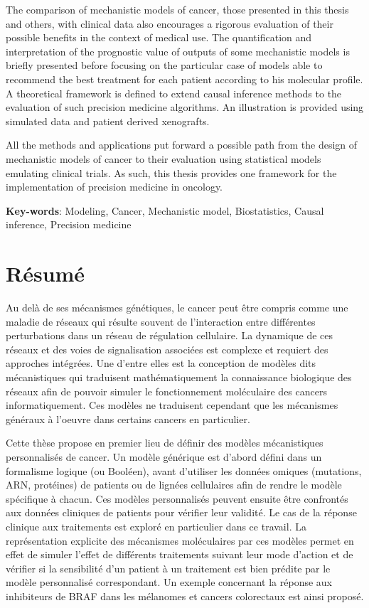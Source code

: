 \documentclass[a4paper,12pt,twoside,onecolumn,openright,final,oldfontcommands]{memoir}
\newcommand{\initial}[1]{
	\lettrine[lines=3,lhang=0.33,nindent=0em]{
		\color{gray}
     		{\textsc{#1}}}{}}
\begin{document}
The comparison of mechanistic models of cancer, those presented in this
thesis and others, with clinical data also encourages a rigorous
evaluation of their possible benefits in the context of medical use. The
quantification and interpretation of the prognostic value of outputs of
some mechanistic models is briefly presented before focusing on the
particular case of models able to recommend the best treatment for each
patient according to his molecular profile. A theoretical framework is
defined to extend causal inference methods to the evaluation of such
precision medicine algorithms. An illustration is provided using
simulated data and patient derived xenografts.

All the methods and applications put forward a possible path from the
design of mechanistic models of cancer to their evaluation using
statistical models emulating clinical trials. As such, this thesis
provides one framework for the implementation of precision medicine in
oncology.

\vspace{\baselineskip}

\textbf{Key-words}: Modeling, Cancer, Mechanistic model, Biostatistics,
Causal inference, Precision medicine

\chapter*{Résumé}

\initial{A}u delà de ses mécanismes génétiques, le cancer peut être
compris comme une maladie de réseaux qui résulte souvent de
l'interaction entre différentes perturbations dans un réseau de
régulation cellulaire. La dynamique de ces réseaux et des voies de
signalisation associées est complexe et requiert des approches
intégrées. Une d'entre elles est la conception de modèles dits
mécanistiques qui traduisent mathématiquement la connaissance biologique
des réseaux afin de pouvoir simuler le fonctionnement moléculaire des
cancers informatiquement. Ces modèles ne traduisent cependant que les
mécanismes généraux à l'oeuvre dans certains cancers en particulier.

Cette thèse propose en premier lieu de définir des modèles mécanistiques
personnalisés de cancer. Un modèle générique est d'abord défini dans un
formalisme logique (ou Booléen), avant d'utiliser les données omiques
(mutations, ARN, protéines) de patients ou de lignées cellulaires afin
de rendre le modèle spécifique à chacun. Ces modèles personnalisés
peuvent ensuite être confrontés aux données cliniques de patients pour
vérifier leur validité. Le cas de la réponse clinique aux traitements
est exploré en particulier dans ce travail. La représentation explicite
des mécanismes moléculaires par ces modèles permet en effet de simuler
l'effet de différents traitements suivant leur mode d'action et de
vérifier si la sensibilité d'un patient à un traitement est bien prédite
par le modèle personnalisé correspondant. Un exemple concernant la
réponse aux inhibiteurs de BRAF dans les mélanomes et cancers
colorectaux est ainsi proposé.
\end{document}
